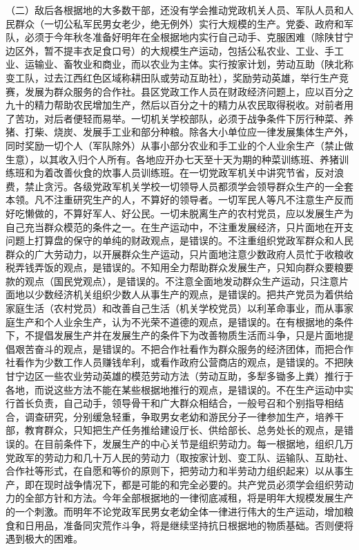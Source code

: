（二）敌后各根据地的大多数干部，还没有学会推动党政机关人员、军队人员和人民群众（一切公私军民男女老少，绝无例外）实行大规模的生产。党委、政府和军队，必须于今年秋冬准备好明年在全根据地内实行自己动手、克服困难（除陕甘宁边区外，暂不提丰衣足食口号）的大规模生产运动，包括公私农业、工业、手工业、运输业、畜牧业和商业，而以农业为主体。实行按家计划，劳动互助（陕北称变工队，过去江西红色区域称耕田队或劳动互助社），奖励劳动英雄，举行生产竞赛，发展为群众服务的合作社。县区党政工作人员在财政经济问题上，应以百分之九十的精力帮助农民增加生产，然后以百分之十的精力从农民取得税收。对前者用了苦功，对后者便轻而易举。一切机关学校部队，必须于战争条件下厉行种菜、养猪、打柴、烧炭、发展手工业和部分种粮。除各大小单位应一律发展集体生产外，同时奖励一切个人（军队除外）从事小部分农业和手工业的个人业余生产（禁止做生意），以其收入归个人所有。各地应开办七天至十天为期的种菜训练班、养猪训练班和为着改善伙食的炊事人员训练班。在一切党政军机关中讲究节省，反对浪费，禁止贪污。各级党政军机关学校一切领导人员都须学会领导群众生产的一全套本领。凡不注重研究生产的人，不算好的领导者。一切军民人等凡不注意生产反而好吃懒做的，不算好军人、好公民。一切未脱离生产的农村党员，应以发展生产为自己充当群众模范的条件之一。在生产运动中，不注重发展经济，只片面地在开支问题上打算盘的保守的单纯的财政观点，是错误的。不注重组织党政军群众和人民群众的广大劳动力，以开展群众生产运动，只片面地注意少数政府人员忙于收粮收税弄钱弄饭的观点，是错误的。不知用全力帮助群众发展生产，只知向群众要粮要款的观点（国民党观点），是错误的。不注意全面地发动群众生产运动，只注意片面地以少数经济机关组织少数人从事生产的观点，是错误的。把共产党员为着供给家庭生活（农村党员）和改善自己生活（机关学校党员）以利革命事业，而从事家庭生产和个人业余生产，认为不光荣不道德的观点，是错误的。在有根据地的条件下，不提倡发展生产并在发展生产的条件下为改善物质生活而斗争，只是片面地提倡艰苦奋斗的观点，是错误的。不把合作社看作为群众服务的经济团体，而把合作社看作为少数工作人员赚钱牟利，或看作政府公营商店的观点，是错误的。不把陕甘宁边区一些农业劳动英雄的模范劳动方法（劳动互助，多犁多锄多上粪）推行于各地，而说这些方法不能在某些根据地推行的观点，是错误的。不在生产运动中实行首长负责，自己动手，领导骨干和广大群众相结合，一般号召和个别指导相结合，调查研究，分别缓急轻重，争取男女老幼和游民分子一律参加生产，培养干部，教育群众，只知把生产任务推给建设厅长、供给部长、总务处长的观点，是错误的。在目前条件下，发展生产的中心关节是组织劳动力。每一根据地，组织几万党政军的劳动力和几十万人民的劳动力（取按家计划、变工队、运输队、互助社、合作社等形式，在自愿和等价的原则下，把劳动力和半劳动力组织起来）以从事生产，即在现时战争情况下，都是可能的和完全必要的。共产党员必须学会组织劳动力的全部方针和方法。今年全部根据地的一律彻底减租，将是明年大规模发展生产的一个刺激。而明年不论党政军民男女老幼全体一律进行伟大的生产运动，增加粮食和日用品，准备同灾荒作斗争，将是继续坚持抗日根据地的物质基础。否则便将遇到极大的困难。

